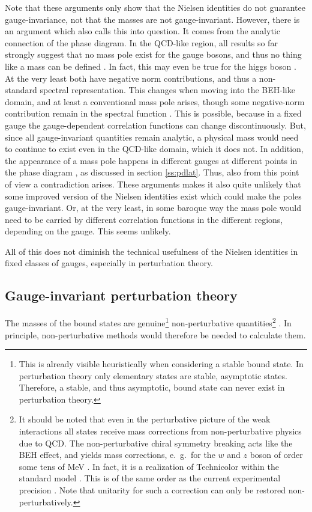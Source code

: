 \documentclass[final,12pt,3p,longtitle]{elsarticle}
\newcommand*{\1}{1\!\!\!\bot}
\begin{document}
Note that these arguments only show that the Nielsen identities do not guarantee gauge-invariance, not that the masses are not gauge-invariant. However, there is an argument which also calls this into question. It comes from the analytic connection of the phase diagram. In the QCD-like region, all results so far strongly suggest that no mass pole exist for the gauge bosons, and thus no thing like a mass can be defined \cite{Maas:2010nc,Capri:2012cr,Maas:2013aia}. In fact, this may even be true for the higgs boson \cite{Maas:2016edk}. At the very least both have negative norm contributions, and thus a non-standard spectral representation. This changes when moving into the BEH-like domain, and at least a conventional mass pole arises, though some negative-norm contribution remain in the spectral function \cite{Maas:2010nc,Maas:2013aia}. This is possible, because in a fixed gauge the gauge-dependent correlation functions can change discontinuously. But, since all gauge-invariant quantities remain analytic, a physical mass would need to continue to exist even in the QCD-like domain, which it does not. In addition, the appearance of a mass pole happens in different gauges at different points in the phase diagram \cite{Caudy:2007sf}, as discussed in section \ref{ss:pdlat}. Thus, also from this point of view a contradiction arises. These arguments makes it also quite unlikely that some improved version of the Nielsen identities exist which could make the poles gauge-invariant. Or, at the very least, in some baroque way the mass pole would need to be carried by different correlation functions in the different regions, depending on the gauge. This seems unlikely.

All of this does not diminish the technical usefulness of the Nielsen identities in fixed classes of gauges, especially in perturbation theory.

\subsection{Gauge-invariant perturbation theory}\label{ss:gipt}

The masses of the bound states are genuine\footnote{This is already visible heuristically when considering a stable bound state. In perturbation theory only elementary states are stable, asymptotic states. Therefore, a stable, and thus asymptotic, bound state can never exist in perturbation theory.} non-perturbative quantities\footnote{It should be noted that even in the perturbative picture of the weak interactions all states receive mass corrections from non-perturbative physics due to QCD. The non-perturbative chiral symmetry breaking acts like the BEH effect, and yields mass corrections, e.\ g.\ for the $w$ and $z$ boson of order some tens of MeV \cite{Quigg:2009xr}. In fact, it is a realization of Technicolor \cite{Hill:2002ap,Morrissey:2009tf,Andersen:2011yj} within the standard model \cite{Quigg:2009xr}. This is of the same order as the current experimental precision \cite{pdg}. Note that unitarity for such a correction can only be restored non-perturbatively.} \cite{Alkofer:2000wg,Hoyer:2014gna}. In principle, non-perturbative methods would therefore be needed to calculate them.
\end{document}
